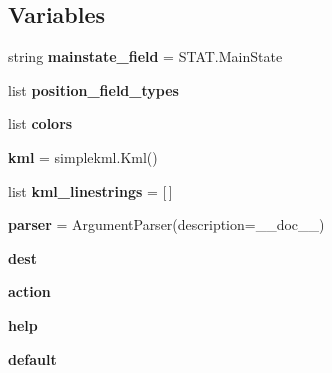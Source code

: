 \subsection*{Variables}
\begin{DoxyCompactItemize}
\item 
\mbox{\label{namespacepymavlink_1_1tools_1_1mavkml_aad726a3ac909c018fb1303b9d05eb634}} 
string {\bfseries mainstate\+\_\+field} = \textquotesingle{}S\+T\+A\+T.\+Main\+State\textquotesingle{}
\item 
list {\bfseries position\+\_\+field\+\_\+types}
\item 
list {\bfseries colors}
\item 
\mbox{\label{namespacepymavlink_1_1tools_1_1mavkml_a00647bf0ef524ff39f244060515b7da1}} 
{\bfseries kml} = simplekml.\+Kml()
\item 
\mbox{\label{namespacepymavlink_1_1tools_1_1mavkml_ae3061f22c947980910bd196d0d00ba18}} 
list {\bfseries kml\+\_\+linestrings} = \mbox{[}$\,$\mbox{]}
\item 
\mbox{\label{namespacepymavlink_1_1tools_1_1mavkml_a1a6f129dd1833552809a583a1739738c}} 
{\bfseries parser} = Argument\+Parser(description=\+\_\+\+\_\+doc\+\_\+\+\_\+)
\item 
\mbox{\label{namespacepymavlink_1_1tools_1_1mavkml_ae2719bf1d17db1e9d15924fc8cdf8c46}} 
{\bfseries dest}
\item 
\mbox{\label{namespacepymavlink_1_1tools_1_1mavkml_ad9aae12df2537904d826fbe65008f651}} 
{\bfseries action}
\item 
\mbox{\label{namespacepymavlink_1_1tools_1_1mavkml_a2a16af23b63e78e5ce1444915a6406c6}} 
{\bfseries help}
\item 
\mbox{\label{namespacepymavlink_1_1tools_1_1mavkml_aab389ebfae522a257242459ae7ce5bf2}} 
{\bfseries default}
\item 
\mbox{\label{namespacepymavlink_1_1tools_1_1mavkml_a986f261d0f729c9b21cef5beeb13ae3d}} 

\end{DoxyCompactItemize}
